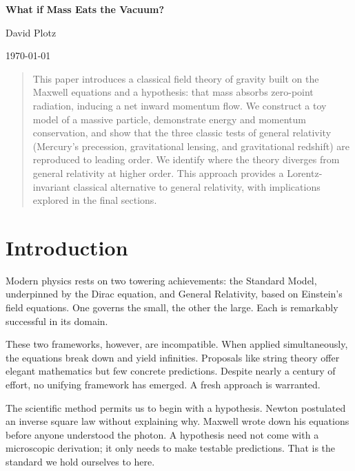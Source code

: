 \documentclass {article}
\begin{document}
	\thispagestyle{empty}%

	
\begin{center}\strut
	\bfseries\Huge
	What if  Mass Eats the Vacuum? 

\end{center}


\centerline{David Plotz }

\begin{center}\strut
	\date{\today}
	{\today}
\end{center}
\vfill

	
\newpage
\begin{abstract}
	This paper introduces a classical field theory of gravity built on the Maxwell equations and a hypothesis: that mass absorbs zero-point radiation, inducing a net inward momentum flow. We construct a toy model of a massive particle, demonstrate energy and momentum conservation, and show that the three classic tests of general relativity (Mercury's precession, gravitational lensing, and gravitational redshift) are reproduced to leading order. We identify where the theory diverges from general relativity at higher order. This approach provides a Lorentz-invariant classical alternative to general relativity, with implications explored in the final sections.
\end{abstract}
\newpage

\section{Introduction}

 Modern physics rests on two towering achievements: the Standard Model, underpinned by the Dirac equation, and General Relativity, based on Einstein’s field equations. One governs the small, the other the large. Each is remarkably successful in its domain.

These two frameworks, however, are incompatible. When applied simultaneously, the equations break down and yield infinities.  Proposals like string theory offer elegant mathematics but few concrete predictions. Despite nearly a century of effort, no unifying framework has emerged. A fresh approach is warranted.

The scientific method permits us to begin with a hypothesis. Newton postulated an inverse square law without explaining why. Maxwell wrote down his equations before anyone understood the photon. A hypothesis need not come with a microscopic derivation; it only needs to make testable predictions. That is the standard we hold ourselves to here.
\end{document}
